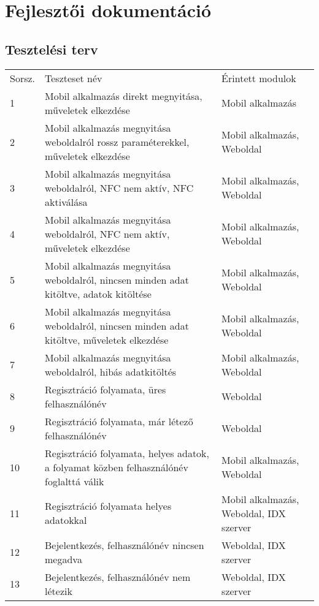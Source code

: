 \section{Fejlesztői dokumentáció}

\subsection{Tesztelési terv}

\begin{tabular}{|p{1cm}|p{8cm} |p{4cm}|}
  \hline
\rowcolor{Title}
\multicolumn{3}{ |c| }{\color{white} Teszteset leírása} \\
  \hline
\rowcolor{Header}
Sorsz. & Teszteset név & Érintett modulok\tabularnewline
\hline 
  1 & Mobil alkalmazás direkt megnyitása, műveletek elkezdése & Mobil alkalmazás  \tabularnewline
  \hline
  2  & Mobil alkalmazás megnyitása weboldalról rossz paraméterekkel, műveletek elkezdése & Mobil alkalmazás, Weboldal  \tabularnewline
  \hline
 3  & Mobil alkalmazás megnyitása weboldalról, NFC nem aktív, NFC aktiválása & Mobil alkalmazás, Weboldal  \tabularnewline
  \hline
 4  & Mobil alkalmazás megnyitása weboldalról, NFC nem aktív, műveletek elkezdése & Mobil alkalmazás, Weboldal  \tabularnewline
  \hline
 5  & Mobil alkalmazás megnyitása weboldalról, nincsen minden adat kitöltve, adatok kitöltése & Mobil alkalmazás, Weboldal  \tabularnewline
  \hline
 6  & Mobil alkalmazás megnyitása weboldalról, nincsen minden adat kitöltve, műveletek elkezdése & Mobil alkalmazás, Weboldal  \tabularnewline
  \hline
 7  & Mobil alkalmazás megnyitása weboldalról, hibás adatkitöltés & Mobil alkalmazás, Weboldal  \tabularnewline
  \hline
 8  & Regisztráció folyamata, üres felhasználónév &  Weboldal  \tabularnewline
  \hline
 9  & Regisztráció folyamata, már létező felhasználónév &  Weboldal  \tabularnewline
  \hline
 10  & Regisztráció folyamata, helyes adatok, a folyamat közben felhasználónév foglalttá válik &   Mobil alkalmazás, Weboldal \tabularnewline
  \hline
 11  & Regisztráció folyamata helyes adatokkal & Mobil alkalmazás, Weboldal, IDX szerver  \tabularnewline
  \hline
 12  & Bejelentkezés, felhasználónév nincsen megadva & Weboldal, IDX szerver \tabularnewline
  \hline
 13  & Bejelentkezés, felhasználónév nem létezik & Weboldal, IDX szerver \tabularnewline
  \hline
\end{tabular}

